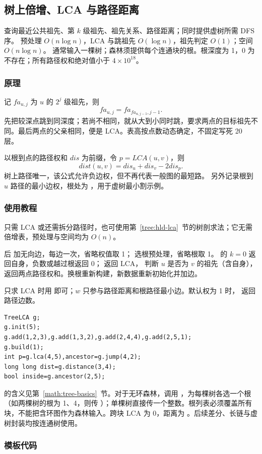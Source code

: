 \subsection{树上倍增、LCA 与路径距离}
\label{tree:lca}
\AlgorithmInfo
    {查询最近公共祖先、第 $k$ 级祖先、祖先关系、路径距离；同时提供虚树所需 DFS 序。}
    {预处理 $O(n\log n)$，LCA 与跳祖先 $O(\log n)$，祖先判定 $O(1)$；空间 $O(n\log n)$。}
    {通常输入一棵树；森林须提供每个连通块的根。根深度为 1，0 为不存在；所有路径权和绝对值小于 $4\times10^{18}$。}
\subsubsection*{原理}
记 $fa_{u,j}$ 为 $u$ 的 $2^j$ 级祖先，则
\[
    fa_{u,j}=fa_{fa_{u,j-1},j-1}.
\]
先把较深点跳到同深度；若尚不相同，就从大到小同时跳，要求两点的目标祖先不同。最后两点的父亲相同，便是 LCA。表高按点数动态确定，不固定写死 20 层。

以根到点的路径权和 $dis$ 为前缀，令 $p=LCA(u,v)$，则
\[
    dist(u,v)=dis_u+dis_v-2dis_p.
\]
树上路径唯一，该公式允许负边权，但不再代表一般图的最短路。 另外记录根到 $u$ 路径的最小边权，根处为 ，用于虚树最小割示例。
\subsubsection*{使用教程}
只需 LCA 或还需拆分路径时，也可使用第~\ref{tree:hld-lca}~节的树剖求法；它无需倍增表，预处理与空间均为 $O(n)$。

 后  加无向边，每边一次，省略权值取 1； 选根预处理，省略根取 1。 的 $k=0$ 返回自身，负数或越过根返回 0； 返回 LCA， 判断 $u$ 是否为 $v$ 的祖先（含自身）， 返回两点路径权和。换根重新构建，新数据重新初始化并加边。

只求 LCA 时用  即可；$w$ 只参与路径距离和根路径最小边。默认权为 1 时， 返回路径边数。
\begin{lstlisting}[style=mtycpp,numbers=none]
TreeLCA g;
g.init(5);
g.add(1,2,3),g.add(1,3,2),g.add(2,4,4),g.add(2,5,1);
g.build(1);
int p=g.lca(4,5),ancestor=g.jump(4,2);
long long dist=g.distance(3,4);
bool inside=g.ancestor(2,5);
\end{lstlisting}
 的含义见第~\ref{math:tree-basics}~节。对于无环森林，调用 ，为每棵树各选一个根（如两棵树的根为 1、4，则传 ）；单棵树直接传一个整数。根列表必须覆盖所有块，不能把含环图作为森林输入。跨块 LCA 为 0，距离为 。后续差分、长链与虚树封装均按连通树使用。
\subsubsection*{模板代码}
